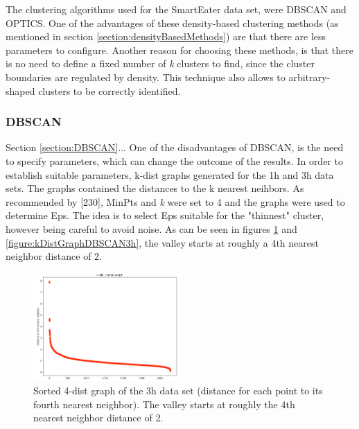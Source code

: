 The clustering algorithms used for the SmartEater data set, were DBSCAN and OPTICS. One of the advantages of these density-based clustering methods (as mentioned in section \ref{section:densityBasedMethods}) are that there are less parameters to configure. Another reason for choosing these methods, is that there is no need to define a fixed number of \textit{k} clusters to find, since the cluster boundaries are regulated by density. This technique also allows to arbitrary-shaped clusters to be correctly identified.

\subsubsection{DBSCAN}
Section \ref{section:DBSCAN}...
One of the disadvantages of DBSCAN, is the need to specify parameters, which can change the outcome of the results. In order to establish suitable parameters, k-dist graphs generated for the 1h and 3h data sets. The graphs contained the distances to the k nearest neihbors. As recommended by \textcite{DBSCAN}[230], MinPts and \textit{k} were set to 4 and the graphs were used to determine Eps. The idea is to select Eps suitable for the "thinnest" cluster, however being careful to avoid noise. As can be seen in figures \ref{figure:kDistGraphDBSCAN1h} and \ref{figure:kDistGraphDBSCAN3h}, the valley starts at roughly a 4th nearest neighbor distance of 2. 



\begin{figure}[h]
  \centering
  \includegraphics[width=0.5\textwidth]{./images/kDistGraphDBSCAN1h.png}
  \caption{Sorted 4-dist graph of the 3h data set (distance for each point to its fourth nearest neighbor). The valley starts at roughly the 4th nearest neighbor distance of 2.}
  \label{figure:kDistGraphDBSCAN1h}
\end{figure}

